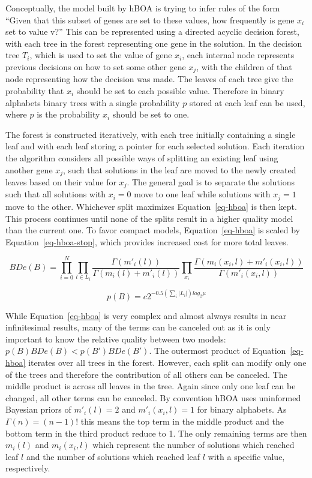 \documentclass[twoside]{article}
\begin{document}
Conceptually, the model built by hBOA is trying to infer rules of the form ``Given that this
subset of genes are set to these values, how frequently is gene $x_i$ set to value v?'' This can
be represented using a directed acyclic decision forest, with each tree in the forest representing one gene
in the solution. In the decision tree $T_i$, which is used to set the value of gene $x_i$,
each internal node represents previous decisions on how to set
some other gene $x_j$, with the children of that node representing how the decision was made. The
leaves of each tree give the probability that $x_i$ should be set to each possible value.
Therefore in binary alphabets binary trees with a single probability $p$ stored at each leaf
can be used, where $p$ is the probability $x_i$ should be set to one.

The forest is constructed iteratively, with each tree initially containing a single leaf
and with each leaf storing a pointer for each selected solution. Each iteration the algorithm considers
all possible ways of splitting an existing leaf using another gene $x_j$, such that solutions in the
leaf are moved to the newly created leaves based on their value for $x_j$. The general goal is to
separate the solutions such that all solutions with $x_i = 0$ move to one leaf while solutions with
$x_j = 1$ move to the other. Whichever split maximizes Equation~\ref{eq-hboa} is then kept.
This process continues until none of the splits result in a higher quality model than the current one. To favor compact
models, Equation~\ref{eq-hboa} is scaled by Equation~\ref{eq-hboa-stop}, which provides increased cost
for more total leaves.

\begin{equation}
  BDe(B) = \prod_{i=0}^{N}\prod_{l\in L_i} \frac{\Gamma(m'_i(l))}{\Gamma(m_i(l) + m'_i(l))}
  \prod_{x_i}\frac{\Gamma(m_i(x_i, l) + m'_i(x_i,l))}{\Gamma(m'_i(x_i,l))}
  \label{eq-hboa}
\end{equation}

\begin{equation}
  p(B) = c2^{-0.5(\sum_i|L_i|)log_2\mu}
  \label{eq-hboa-stop}
\end{equation}

While Equation~\ref{eq-hboa} is very complex and almost always results in near infinitesimal results, many
of the terms can be canceled out as it is only important to know the relative quality between two models:
$p(B)BDe(B) < p(B')BDe(B')$.
The outermost product of Equation~\ref{eq-hboa} iterates over all trees in the forest. However, each split
can modify only one of the trees and therefore the contribution of all others can be canceled. The middle
product is across all leaves in the tree. Again since only one leaf can be changed, all other terms can
be canceled. By convention hBOA uses uninformed Bayesian priors of $m'_i(l)= 2$ and $m'_i(x_i, l)=1$ for
binary alphabets. As $\Gamma(n) = (n-1)!$ this means the top term in the middle product and the bottom
term in the third product reduce to 1. The only remaining terms are then $m_i(l)$ and $m_i(x_i, l)$ which
represent the number of solutions which reached leaf $l$ and the number of solutions which reached leaf $l$
with a specific value, respectively.
\end{document}
